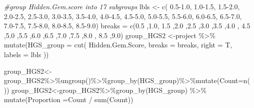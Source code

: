 \documentclass[
]{article}
\newenvironment{Shaded}{\begin{snugshade}}{\end{snugshade}}
\newcommand{\AttributeTok}[1]{\textcolor[rgb]{0.77,0.63,0.00}{#1}}
\newcommand{\CommentTok}[1]{\textcolor[rgb]{0.56,0.35,0.01}{\textit{#1}}}
\newcommand{\FloatTok}[1]{\textcolor[rgb]{0.00,0.00,0.81}{#1}}
\newcommand{\FunctionTok}[1]{\textcolor[rgb]{0.00,0.00,0.00}{#1}}
\newcommand{\NormalTok}[1]{#1}
\newcommand{\OtherTok}[1]{\textcolor[rgb]{0.56,0.35,0.01}{#1}}
\newcommand{\SpecialCharTok}[1]{\textcolor[rgb]{0.00,0.00,0.00}{#1}}
\newcommand{\StringTok}[1]{\textcolor[rgb]{0.31,0.60,0.02}{#1}}
\begin{document}
\begin{Shaded}
\begin{Highlighting}[]
\CommentTok{\#group Hidden.Gem.score into 17 subgroups }
\NormalTok{lbls }\OtherTok{\textless{}{-}}
  \FunctionTok{c}\NormalTok{( }\StringTok{\textquotesingle{}0.5{-}1.0\textquotesingle{}}\NormalTok{, }\StringTok{\textquotesingle{}1.0{-}1.5\textquotesingle{}}\NormalTok{,  }\StringTok{\textquotesingle{}1.5{-}2.0\textquotesingle{}}\NormalTok{,  }\StringTok{\textquotesingle{}2.0{-}2.5\textquotesingle{}}\NormalTok{, }\StringTok{\textquotesingle{}2.5{-}3.0\textquotesingle{}}\NormalTok{,}
     \StringTok{\textquotesingle{}3.0{-}3.5\textquotesingle{}}\NormalTok{, }\StringTok{\textquotesingle{}3.5{-}4.0\textquotesingle{}}\NormalTok{,  }\StringTok{\textquotesingle{}4.0{-}4.5\textquotesingle{}}\NormalTok{,  }\StringTok{\textquotesingle{}4.5{-}5.0\textquotesingle{}}\NormalTok{, }\StringTok{\textquotesingle{}5.0{-}5.5\textquotesingle{}}\NormalTok{,}
     \StringTok{\textquotesingle{}5.5{-}6.0\textquotesingle{}}\NormalTok{, }\StringTok{\textquotesingle{}6.0{-}6.5\textquotesingle{}}\NormalTok{,  }\StringTok{\textquotesingle{}6.5{-}7.0\textquotesingle{}}\NormalTok{,  }\StringTok{\textquotesingle{}7.0{-}7.5\textquotesingle{}}\NormalTok{, }\StringTok{\textquotesingle{}7.5{-}8.0\textquotesingle{}}\NormalTok{,}
     \StringTok{\textquotesingle{}8.0{-}8.5\textquotesingle{}}\NormalTok{, }\StringTok{\textquotesingle{}8.5{-}9.0\textquotesingle{}}\NormalTok{)}
\NormalTok{breaks }\OtherTok{=} \FunctionTok{c}\NormalTok{(}\FloatTok{0.5}\NormalTok{ ,}\FloatTok{1.0}\NormalTok{, }\FloatTok{1.5}\NormalTok{ ,}\FloatTok{2.0}\NormalTok{ ,}\FloatTok{2.5}\NormalTok{ ,}\FloatTok{3.0}\NormalTok{ ,}\FloatTok{3.5}\NormalTok{ ,}\FloatTok{4.0}\NormalTok{ ,}
           \FloatTok{4.5}\NormalTok{ ,}\FloatTok{5.0}\NormalTok{ ,}\FloatTok{5.5}\NormalTok{ ,}\FloatTok{6.0}\NormalTok{ ,}\FloatTok{6.5}\NormalTok{ ,}\FloatTok{7.0}\NormalTok{ ,}\FloatTok{7.5}\NormalTok{ ,}\FloatTok{8.0}\NormalTok{ ,}
           \FloatTok{8.5}\NormalTok{ ,}\FloatTok{9.0}\NormalTok{)}
\NormalTok{group\_HGS2 }\OtherTok{\textless{}{-}}\NormalTok{project }\SpecialCharTok{\%\textgreater{}\%} \FunctionTok{mutate}\NormalTok{(}\AttributeTok{HGS\_group =} \FunctionTok{cut}\NormalTok{(}
\NormalTok{             Hidden.Gem.Score,}
             \AttributeTok{breaks =}\NormalTok{ breaks,}
             \AttributeTok{right =}\NormalTok{ T,}
             \AttributeTok{labels =}\NormalTok{ lbls ))}

\NormalTok{group\_HGS2}\OtherTok{\textless{}{-}}\NormalTok{group\_HGS2}\SpecialCharTok{\%\textgreater{}\%}\FunctionTok{ungroup}\NormalTok{()}\SpecialCharTok{\%\textgreater{}\%}\FunctionTok{group\_by}\NormalTok{(HGS\_group)}\SpecialCharTok{\%\textgreater{}\%}\FunctionTok{mutate}\NormalTok{(}\AttributeTok{Count=}\FunctionTok{n}\NormalTok{())}
\NormalTok{group\_HGS2}\OtherTok{\textless{}{-}}\NormalTok{group\_HGS2}\SpecialCharTok{\%\textgreater{}\%}\FunctionTok{group\_by}\NormalTok{(HGS\_group) }\SpecialCharTok{\%\textgreater{}\%} \FunctionTok{mutate}\NormalTok{(}\AttributeTok{Proportion =}\NormalTok{Count }\SpecialCharTok{/} \FunctionTok{sum}\NormalTok{(Count))}


\end{Highlighting}
\end{Shaded}
\end{document}
